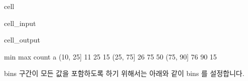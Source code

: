 \documentclass[letterpaper,10pt,english]{jupyterBook}
\begin{document}
\begin{sphinxuseclass}{cell}\begin{sphinxVerbatimInput}

\begin{sphinxuseclass}{cell_input}
\begin{sphinxVerbatim}[commandchars=\\\{\}]
  \PYG{p}{[}\PYG{p}{]} \PYG{p}{[}   \PYG{p}{]}
\PYG{p}{[}\PYG{p}{]}\PYG{p}{[}\PYG{p}{]}
\end{sphinxVerbatim}

\end{sphinxuseclass}\end{sphinxVerbatimInput}
\begin{sphinxVerbatimOutput}

\begin{sphinxuseclass}{cell_output}
\begin{sphinxVerbatim}[commandchars=\\\{\}]
          min  max  count
a                        
(10, 25]   11   25     15
(25, 75]   26   75     50
(75, 90]   76   90     15
\end{sphinxVerbatim}

\end{sphinxuseclass}\end{sphinxVerbatimOutput}

\end{sphinxuseclass}
\sphinxAtStartPar
bins 구간이 모든 값을 포함하도록 하기 위해서는 아래와 같이 bins 를 설정합니다.
\end{document}
